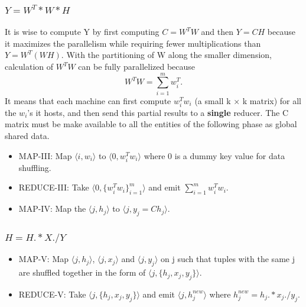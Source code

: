 \documentclass[a4paper,12pt]{article}
\begin{document}
     \subsubsection{$ Y = W^T * W * H $}
       It is wise to compute Y by first computing $C= W^T W$ and then
       $Y=CH$ because it maximizes the parallelism while requiring
       fewer multiplications than $Y= W^T (W H)$. 
       With the partitioning of W along the smaller dimension, calculation of $ W^T W $ can be
       fully parallelized because $$ W^T W = \sum_{i=1}^{m} w_i^T. $$
       It means that each machine can first compute $w_i^T w_i$  (a
       small k × k matrix) for all the $w_i$’s it hosts, and then send
       this partial results to a \textbf{single} reducer. 
       The C matrix must be make
       available to all the entities of the following phase as global
       shared data.

       \begin{itemize}

         \item MAP-III: Map $\langle i, w_i \rangle$ to  $\langle 0,
           w_i^T w_i \rangle$ where 0 is a dummy key value for data
           shuffling.

          \item REDUCE-III: Take $\langle 0,
           \{w_i^T w_i\}_{i=1}^{m} \rangle $ and emit $\sum_{i=1}^{m} w_i^T w_i$.

         \item MAP-IV: Map the $ \langle j, h_j \rangle$ to $ \langle
           j, y_j = Ch_j \rangle$.

       \end{itemize}


     \subsubsection{$ H = H .* X ./ Y $}
       \begin{itemize}

       \item MAP-V: Map $\langle j, h_j \rangle$, $\langle j, x_j
           \rangle$ and $\langle j, y_j \rangle$ on j such that tuples
           with the same j are shuffled together in the form of
           $\langle j, \{h_j, x_j, y_j\} \rangle$.

         \item REDUCE-V: Take $\langle j, \{h_j, x_j, y_j\} \rangle$
            and emit $\langle j, h_j^{new} \rangle$ where $h_j^{new} =
            h_j .* x_j ./ y_j $.

          \end{itemize}
\end{document}
